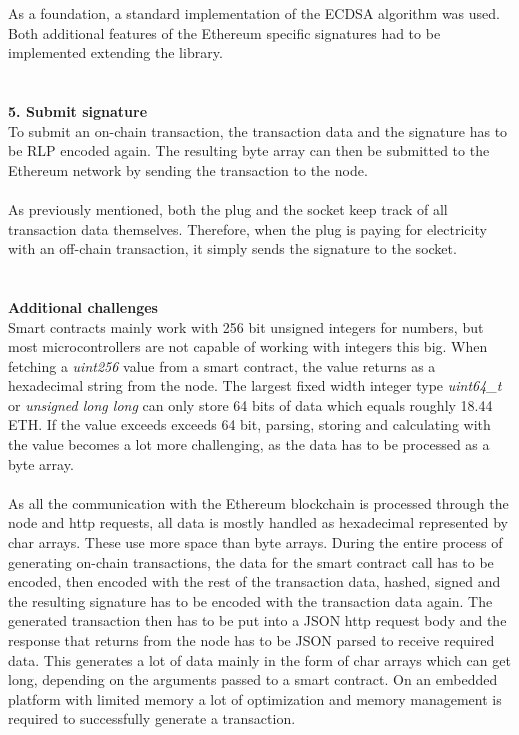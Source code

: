 As a foundation, a standard implementation of the ECDSA algorithm\cite{micro-ecc} was used.
Both additional features of the Ethereum specific signatures had to be implemented extending the library.
\\\\\\
\textbf{5. Submit signature}\\
To submit an on-chain transaction, the transaction data and the signature has to be RLP encoded again.
The resulting byte array can then be submitted to the Ethereum network by sending the transaction to the node.
\\\\
As previously mentioned, both the plug and the socket keep track of all transaction data themselves.
Therefore, when the plug is paying for electricity with an off-chain transaction, it simply sends the signature to the socket.
\\\\\\
\textbf{Additional challenges}\\
Smart contracts mainly work with 256 bit unsigned integers for numbers, but most microcontrollers are not capable of working with integers this big.
When fetching a \textit{uint256} value from a smart contract, the value returns as a hexadecimal string from the node.
The largest fixed width integer type \textit{uint64\_t} or \textit{unsigned long long} can only store 64 bits of data which equals roughly 18.44 ETH.
If the value exceeds exceeds 64 bit, parsing, storing and calculating with the value becomes a lot more challenging, as the data has to be processed as a byte array.
\\\\
As all the communication with the Ethereum blockchain is processed through the node and http requests, all data is mostly handled as hexadecimal represented by char arrays.
These use more space than byte arrays.
During the entire process of generating on-chain transactions, the data for the smart contract call has to be encoded, then encoded with the rest of the transaction data, hashed, signed and the resulting signature has to be encoded with the transaction data again.
The generated transaction then has to be put into a JSON http request body and the response that returns from the node has to be JSON parsed to receive required data.
This generates a lot of data mainly in the form of char arrays which can get long, depending on the arguments passed to a smart contract.
On an embedded platform with limited memory a lot of optimization and memory management is required to successfully generate a transaction.
\\\\
